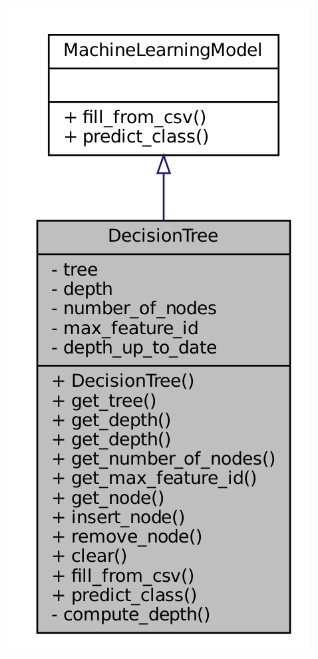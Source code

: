 \documentclass[10pt]{article}
\begin{document}
\begin{minipage}[t]{0.4\linewidth}
\centering
\vspace{-2ex}
\includegraphics[width=0.6\textwidth]{DecisionTreeDiagram.png}
\end{minipage}
\end{document}
